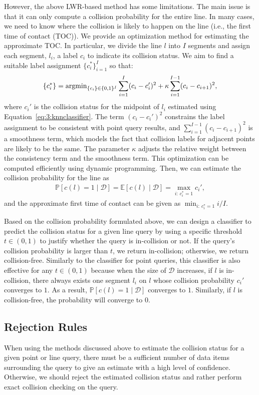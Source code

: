However, the above LWR-based method has some limitations. The main issue is that it can only compute a collision probability for the entire line. In many cases, we need to know where the collision is likely to happen on the line (i.e., the first time of contact (TOC)). We provide an optimization method for estimating the approximate TOC. In particular, we divide the line $l$ into $I$ segments and assign each segment, $l_i$, a label $c_i$ to indicate its collision status. We aim to find a suitable label assignment $\{c_i^*\}_{i=1}^I$ so that:
\begin{equation}
  \{c_i^*\} = \operatorname{argmin}_{\{c_i\} \in \{0,1\}^I} \sum_{i=1}^I (c_i - c_i')^2 + \kappa \sum_{i=1}^{I-1}(c_i - c_{i+1})^2,
\end{equation}
where $c_i'$ is the collision status for the midpoint of $l_i$ estimated using Equation~\ref{eq:3:knnclassifier}. The term $(c_i - c_i')^2$ constrains the label assignment to be consistent with point query results, and $\sum_{i=1}^{I-1}(c_i - c_{i+1})^2$ is a smoothness term, which models the fact that collision labels for adjacent points are likely to be the same. The parameter $\kappa$ adjusts the relative weight between the consistency term and the smoothness term. This optimization can be computed efficiently using dynamic programming. Then, we can estimate the collision probability for the line as
\begin{align}
  \label{eq:3:linepointprob}
  \mathbb P[c(l) = 1 \mid \mathcal D] = \mathbb E[c(l) \mid \mathcal D] = \max_{i: \ c_i^* = 1} c_i',
\end{align}
and the approximate first time of contact can be given as $\min_{i: \ c_i^* = 1} i / I$.


Based on the collision probability formulated above, we can design a classifier to predict the collision status for a given line query by using a specific threshold $t \in (0, 1)$ to justify whether the query is in-collision or not. If the query's collision probability is larger than $t$, we return in-collision; otherwise, we return collision-free. Similarly to the classifier for point queries, this classifier is also effective for any $t \in (0, 1)$ because when the size of $\mathcal D$ increases, if $l$ is in-collision, there always exists one segment $l_i$ on $l$ whose collision probability $c_i'$ converges to $1$. As a result, $\mathbb P[c(l) = 1 \mid \mathcal D]$ converges to $1$. Similarly, if $l$ is collision-free, the probability will converge to $0$.

\subsection{Rejection Rules}
\label{subsec:3:knnreasoning:rejection}
When using the methods discussed above to estimate the collision status for a given point or line query, there must be a sufficient number of data items surrounding the query to give an estimate with a high level of confidence. Otherwise, we should reject the estimated collision status and rather perform exact collision checking on the query.


